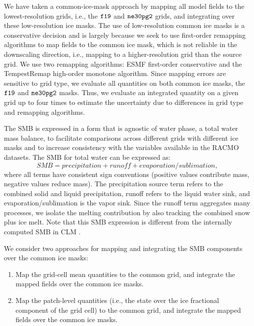 \documentclass[draft]{agujournal2019}
\begin{document}
We have taken a common-ice-mask approach by mapping all model fields to the lowest-resolution grids, i.e., the $\tt f19$ and $\tt ne30pg2$ grids, and integrating over these low-resolution ice masks. The use of low-resolution common ice masks is a conservative decision and is largely because we seek to use first-order remapping algorithms to map fields to the common ice mask, which is not reliable in the downscaling direction, i.e., mapping to a higher-resolution grid than the source grid. We use two remapping algorithms: ESMF first-order conservative and the TempestRemap \cite{TempestRemap} high-order monotone algorithm. Since mapping errors are sensitive to grid type, we evaluate all quantities on both common ice masks, the $\tt f19$ and $\tt ne30pg2$ masks. Thus, we evaluate an integrated quantity on a given grid up to four times to estimate the uncertainty due to differences in grid type and remapping algorithms.

The SMB is expressed in a form that is agnostic of water phase, a total water mass balance, to facilitate comparisons across different grids with different ice masks and to increase consistency with the variables available in the RACMO datasets. The SMB for total water can be expressed as:
\begin{equation}
SMB = precipitation + runoff + evaporation/sublimation, \label{eq:SMB}
\end{equation}
where all terms have consistent sign conventions (positive values contribute mass, negative values reduce mass). The precipitation source term refers to the combined solid and liquid precipitation, runoff refers to the liquid water sink, and evaporation/sublimation is the vapor sink. Since the runoff term aggregates many processes, we isolate the melting contribution by also tracking the combined snow plus ice melt. Note that this SMB expression is different from the internally computed SMB in CLM \cite{KETAL2020JAMES}.

We consider two approaches for mapping and integrating the SMB components over the common ice masks:
\begin{enumerate}
\item Map the grid-cell mean quantities to the common grid, and integrate the mapped fields over the common ice masks. \label{lbl:label1}
\item Map the patch-level quantities (i.e., the state over the ice fractional component of the grid cell) to the common grid, and integrate the mapped fields over the common ice masks. \label{lbl:label2}
\end{enumerate}
\end{document}
